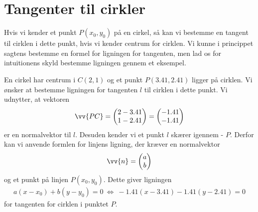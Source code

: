 \section*{Tangenter til cirkler}
Hvis vi kender et punkt $P(x_0,y_0)$ på en cirkel, så kan vi bestemme en tangent til cirklen i dette punkt, hvis vi kender centrum for cirklen. Vi kunne i princippet sagtens bestemme en formel for ligningen for tangenten, men lad os for intuitionens skyld bestemme ligningen gennem et eksempel.
\begin{exa}
En cirkel har centrum i $C(2,1)$ og et punkt $P(3.41,2.41)$ ligger på cirklen. Vi ønsker at bestemme ligningen for tangenten $l$ til cirklen i dette punkt. Vi udnytter, at vektoren 
\begin{align*}
\vv{PC} = 
\begin{pmatrix}
2-3.41 \\ 1-2.41
\end{pmatrix} =
\begin{pmatrix}
-1.41 \\ -1.41
\end{pmatrix}
\end{align*}
er en normalvektor til $l$. Desuden kender vi et punkt $l$ skærer igennem - $P$. Derfor kan vi anvende formlen for linjens ligning, der kræver en normalvektor 
\begin{align*}
\vv{n} = \begin{pmatrix}
a \\ b
\end{pmatrix}
\end{align*} 
og et punkt på linjen $P(x_0,y_0)$. Dette giver ligningen
\begin{align*}
a(x-x_0) + b(y-y_0) = 0 \ \Leftrightarrow \ -1.41(x-3.41) -1.41(y-2.41) = 0
\end{align*}
for tangenten for cirklen i punktet $P$. 
\end{exa}


